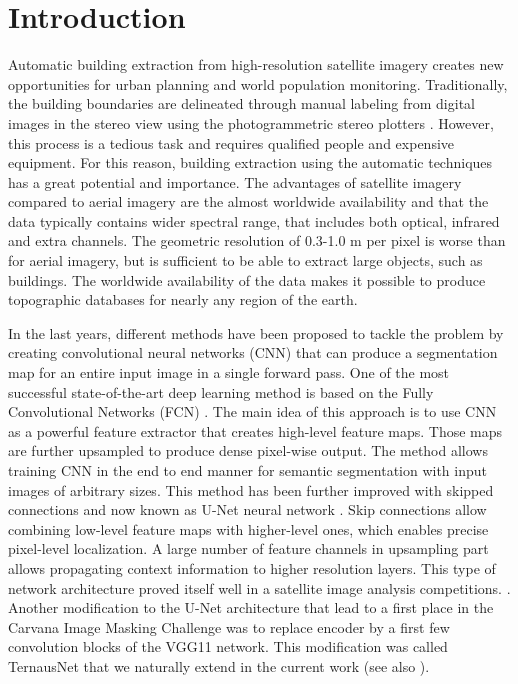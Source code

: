 \documentclass[10pt,twocolumn,letterpaper]{article}
\begin{document}
\section{Introduction}
Automatic building extraction from high-resolution satellite imagery creates new opportunities for urban planning and world population monitoring. Traditionally, the building boundaries are delineated through manual labeling from digital images in the stereo view using the photogrammetric stereo plotters \cite{san2010building}. However, this process is a tedious task and requires qualified people and expensive equipment. For this reason, building extraction using the automatic techniques has a great potential and importance. The advantages of satellite imagery compared to aerial imagery are the almost worldwide availability and that the data typically contains wider spectral range, that includes both optical, infrared and extra channels. The geometric resolution of 0.3-1.0 m per pixel is worse than for aerial imagery, but is sufficient to be able to extract large objects, such as buildings. The worldwide availability of the data makes it possible to produce topographic databases for nearly any region of the earth. 

In the last years, different methods have been proposed to tackle the problem by creating convolutional neural networks (CNN) that can produce a segmentation map for an entire input image in a single forward pass. One of the most successful state-of-the-art deep learning method is based on the Fully Convolutional Networks (FCN) \cite{long2015fully}. The main idea of this approach is to use CNN as a powerful feature extractor that creates high-level feature maps. Those maps are further upsampled to produce dense pixel-wise output. The method allows training CNN in the end to end manner for semantic segmentation with input images of arbitrary sizes. This method has been further improved with skipped connections and now known as U-Net neural network \cite{ronneberger2015u}. Skip connections allow combining low-level feature maps with higher-level ones, which enables precise pixel-level localization. A large number of feature channels in upsampling part allows propagating context information to higher resolution layers. This type of network architecture proved itself well in a satellite image analysis competitions. \cite{goldberg2018urban, iglovikov2017satellite, zhang2017building}. Another modification to the U-Net architecture that lead to a first place in the Carvana Image Masking Challenge \cite{kaggle_carvana} was to replace encoder by a first few convolution blocks of the VGG11 network. This modification was called TernausNet \cite{iglovikov2018ternausnet} that we naturally extend in the current work (see also \cite{shvets2018automatic, shvets2018angiodysplasia}).
\end{document}
